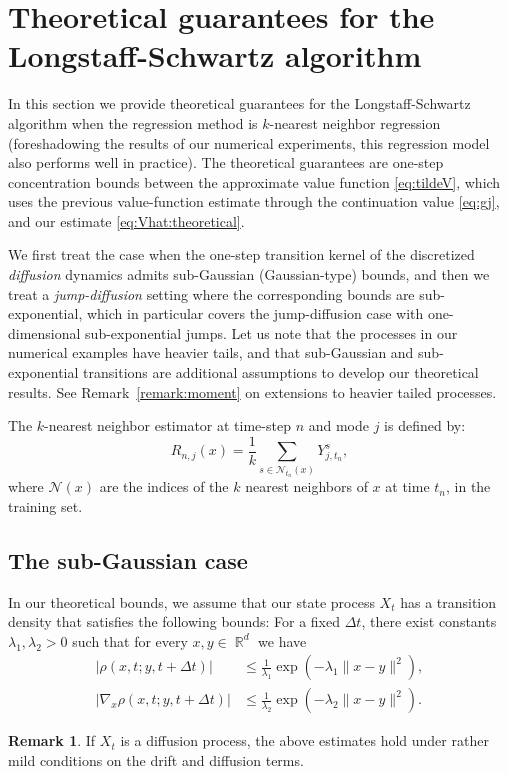 \documentclass[11pt,reqno,a4paper]{amsart}
\theoremstyle{definition}
\newtheorem{remark}[theorem]{Remark}
\numberwithin{equation}{section}
\DeclareMathOperator{\R}{\mathbb{R}}
\DeclareMathOperator{\1}{\mathbbm{1}}
\begin{document}
\section{Theoretical guarantees for the Longstaff-Schwartz algorithm} \label{sec:theoretical}

In this section we provide theoretical guarantees for the Longstaff-Schwartz algorithm when the regression method is $k$-nearest neighbor regression (foreshadowing the results of our numerical experiments, this regression model also performs well in practice). The theoretical guarantees are one-step concentration bounds between the approximate value function \cref{eq:tildeV}, which uses the previous value-function estimate through the continuation value \cref{eq:gj}, and our estimate \cref{eq:Vhat:theoretical}.

We first treat the case when the one-step transition kernel of the discretized \emph{diffusion} dynamics admits sub-Gaussian (Gaussian-type) bounds, and then we treat a \emph{jump-diffusion} setting where the corresponding bounds are sub-exponential, which in particular covers the jump-diffusion case with one-dimensional sub-exponential jumps. Let us note that the processes in our numerical examples have heavier tails, and that sub-Gaussian and sub-exponential transitions are additional assumptions to develop our theoretical results. See Remark~\ref{remark:moment} on extensions to heavier tailed processes.

The $k$-nearest neighbor estimator at time-step $n$ and mode $j$ is defined by:
\begin{equation}\label{eq:knn}
  R_{n,j}(x) = \frac{1}{k}\sum_{s \in \mathcal{N}_{t_n}(x)} Y_{j,t_n}^s,
\end{equation}
where $\mathcal{N}(x)$ are the indices of the $k$ nearest neighbors of $x$ at time $t_{n}$, in the training set.
\subsection{The sub-Gaussian case}
In our theoretical bounds, we assume that our state process $X_t$ has a transition density that satisfies the following bounds: For a fixed $\Delta t$, there exist constants $\lambda_1,\lambda_2>0$ such that for every $x,y \in \R^d$ we have
\begin{equation} \label{eq:transition:bounds}
  \begin{split}
    |\rho(x,t;y,t+\Delta t)|          & \leq \frac{1}{\lambda_1} \exp(-\lambda_1 \|x-y\|^2),
    \\
    |\nabla_x \rho(x,t;y,t+\Delta t)| & \leq \frac{1}{\lambda_2} \exp(-\lambda_2 \|x-y\|^2).
  \end{split}
\end{equation}
\begin{remark}
  If $X_t$ is a diffusion process, the above estimates hold under rather mild conditions on the drift and diffusion terms. 
\end{remark}
\end{document}
